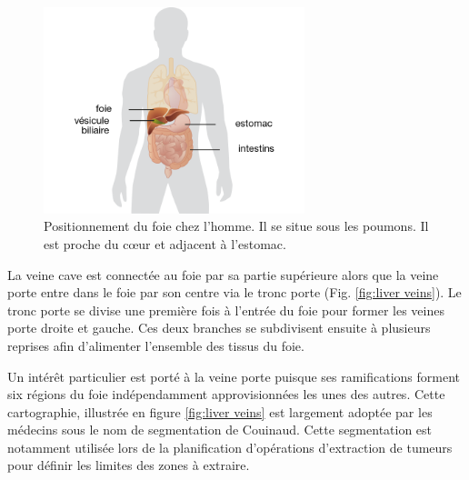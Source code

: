 \begin{figure}[!ht]
    \centering
    \includegraphics[height=6cm]{Images/Liver.png}
    \caption[Hello world]{Positionnement du foie chez l'homme. Il se situe sous les poumons. Il est proche du cœur et adjacent à l'estomac.\protect \footnotemark}
    \label{fig:liver}
  \end{figure}



La veine cave est connectée au foie par sa partie supérieure alors que la veine porte entre dans le foie par son centre via le tronc porte (Fig. \ref{fig:liver veins}). Le tronc porte se divise une première fois à l'entrée du foie pour former les veines  porte droite et gauche. Ces deux branches se subdivisent ensuite à plusieurs reprises afin d'alimenter l'ensemble des tissus du foie. 

Un intérêt particulier est porté à la veine porte puisque ses ramifications forment six régions du foie indépendamment approvisionnées les unes des autres. Cette cartographie, illustrée en figure \ref{fig:liver veins} est largement adoptée par les médecins sous le nom de segmentation de Couinaud. Cette segmentation est notamment utilisée lors de la planification d'opérations d'extraction de tumeurs pour définir les limites des zones à extraire.

